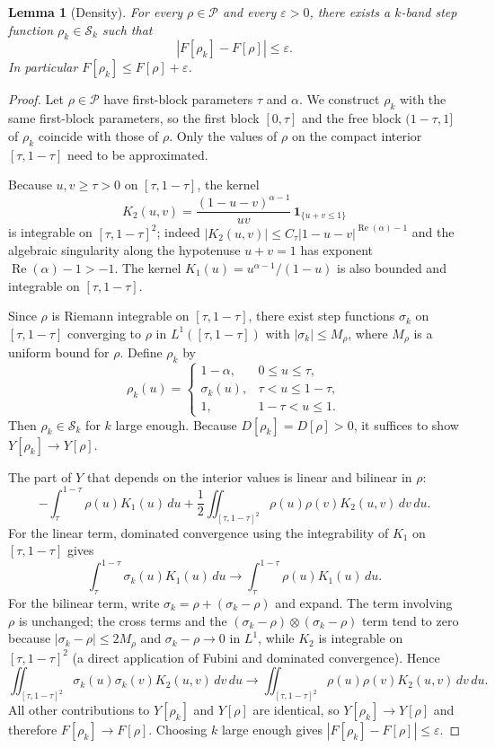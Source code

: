 \documentclass[11pt]{article}
\theoremstyle{plain}
\newtheorem{lem}[thm]{Lemma}
\DeclareMathOperator{\Repart}{Re}
\begin{document}
\begin{lem}[Density]\label{lem:density}
For every $\rho\in\mathcal P$ and every $\varepsilon>0$, there exists a $k$-band step function $\rho_k\in\mathcal S_k$ such that
\[
|F[\rho_k]-F[\rho]|\le\varepsilon.
\]
In particular $F[\rho_k]\le F[\rho]+\varepsilon$.
\end{lem}
\begin{proof}
Let $\rho\in\mathcal P$ have first-block parameters $\tau$ and $\alpha$.  We construct $\rho_k$ with the same first-block parameters, so the first block $[0,\tau]$ and the free block $(1-\tau,1]$ of $\rho_k$ coincide with those of $\rho$.  Only the values of $\rho$ on the compact interior $[\tau,1-\tau]$ need to be approximated.

Because $u,v\ge\tau>0$ on $[\tau,1-\tau]$, the kernel
\[
K_2(u,v)=\frac{(1-u-v)^{\alpha-1}}{uv}\,\mathbf 1_{\{u+v\le1\}}
\]
is integrable on $[\tau,1-\tau]^2$; indeed $|K_2(u,v)|\le C_\tau |1-u-v|^{\Repart(\alpha)-1}$ and the algebraic singularity along the hypotenuse $u+v=1$ has exponent $\Repart(\alpha)-1>-1$.  The kernel $K_1(u)=u^{\alpha-1}/(1-u)$ is also bounded and integrable on $[\tau,1-\tau]$.

Since $\rho$ is Riemann integrable on $[\tau,1-\tau]$, there exist step functions $\sigma_k$ on $[\tau,1-\tau]$ converging to $\rho$ in $L^1([\tau,1-\tau])$ with $|\sigma_k|\le M_\rho$, where $M_\rho$ is a uniform bound for $\rho$.  Define $\rho_k$ by
\[
\rho_k(u)=\begin{cases}
1-\alpha, & 0\le u\le\tau,\\
\sigma_k(u), & \tau<u\le1-\tau,\\
1, & 1-\tau<u\le1.
\end{cases}
\]
Then $\rho_k\in\mathcal S_k$ for $k$ large enough.  Because $D[\rho_k]=D[\rho]>0$, it suffices to show $Y[\rho_k]\to Y[\rho]$.

The part of $Y$ that depends on the interior values is linear and bilinear in $\rho$:
\[
-\!\int_\tau^{1-\tau}\!\rho(u)K_1(u)\,du
+\frac12\!\iint_{[\tau,1-\tau]^2}\!\rho(u)\rho(v)K_2(u,v)\,dv\,du.
\]
For the linear term, dominated convergence using the integrability of $K_1$ on $[\tau,1-\tau]$ gives
\[
\int_\tau^{1-\tau}\sigma_k(u)K_1(u)\,du\longrightarrow
\int_\tau^{1-\tau}\rho(u)K_1(u)\,du.
\]
For the bilinear term, write $\sigma_k=\rho+(\sigma_k-\rho)$ and expand.  The term involving $\rho$ is unchanged; the cross terms and the $(\sigma_k-\rho)\otimes(\sigma_k-\rho)$ term tend to zero because $|\sigma_k-\rho|\le2M_\rho$ and $\sigma_k-\rho\to0$ in $L^1$, while $K_2$ is integrable on $[\tau,1-\tau]^2$ (a direct application of Fubini and dominated convergence).  Hence
\[
\iint_{[\tau,1-\tau]^2}\sigma_k(u)\sigma_k(v)K_2(u,v)\,dv\,du
\longrightarrow
\iint_{[\tau,1-\tau]^2}\rho(u)\rho(v)K_2(u,v)\,dv\,du.
\]
All other contributions to $Y[\rho_k]$ and $Y[\rho]$ are identical, so $Y[\rho_k]\to Y[\rho]$ and therefore $F[\rho_k]\to F[\rho]$.  Choosing $k$ large enough gives $|F[\rho_k]-F[\rho]|\le\varepsilon$.
\end{proof}
\end{document}
